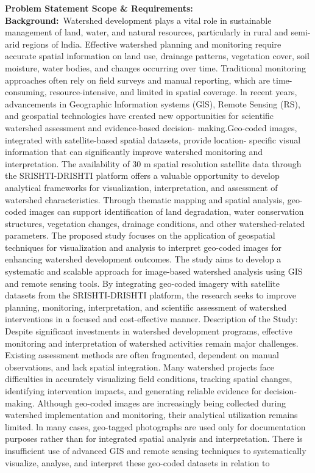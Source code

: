 \documentclass[10pt,a4paper]{article}
\begin{document}
\begin{tcolorbox}[pscard, title={"\textbf{SIH26015} \quad $\vert$ \quad Application of Geospatial Techniques for visualization and analysis to inte...}]
\textbf{\color{sihnavy}Problem Statement Scope \& Requirements:}\\[0.15cm]
\vspace{0.18cm}\noindent\textbf{\color{sihnavy}Background:}~\small Watershed development plays a vital role in sustainable management of land, water, and natural resources, particularly in rural and semi-arid regions of lndia. Effective watershed planning and monitoring require accurate spatial information on land use, drainage patterns, vegetation cover, soil moisture, water bodies, and changes occurring over time. Traditional monitoring approaches often rely on field surveys and manual reporting, which are time-consuming, resource-intensive, and limited in spatial coverage. ln recent years, advancements in Geographic lnformation systems (GlS), Remote Sensing (RS), and geospatial technologies have created new opportunities for scientific watershed assessment and evidence-based decision- making.Geo-coded images, integrated with satellite-based spatial datasets, provide location- specific visual information that can significantly improve watershed monitoring and interpretation. The availability of 30 m spatial resolution satellite data through the SRISHTI-DRISHTI platform offers a valuable opportunity to develop analytical frameworks for visualization, interpretation, and assessment of watershed characteristics. Through thematic mapping and spatial analysis, geo-coded images can support identification of land degradation, water conservation structures, vegetation changes, drainage conditions, and other watershed-related parameters. The proposed study focuses on the application of geospatial techniques for visualization and analysis to interpret geo-coded images for enhancing watershed development outcomes. The study aims to develop a systematic and scalable approach for image-based watershed analysis using GIS and remote sensing tools. By integrating geo-coded imagery with satellite datasets from the SRISHTI-DRISHTI platform, the research seeks to improve planning, monitoring, interpretation, and scientific assessment of watershed interventions in a focused and cost-effective manner. Description of the Study: Despite significant investments in watershed development programs, effective monitoring and interpretation of watershed activities remain major challenges. Existing assessment methods are often fragmented, dependent on manual observations, and lack spatial integration. Many watershed projects face difficulties in accurately visualizing field conditions, tracking spatial changes, identifying intervention impacts, and generating reliable evidence for decision-making. Although geo-coded images are increasingly being collected during watershed implementation and monitoring, their analytical utilization remains limited. ln many cases, geo-tagged photographs are used only for documentation purposes rather than for integrated spatial analysis and interpretation. There is insufficient use of advanced GIS and remote sensing techniques to systematically visualize, analyse, and interpret these geo-coded datasets in relation to 
\end{tcolorbox}
\end{document}
